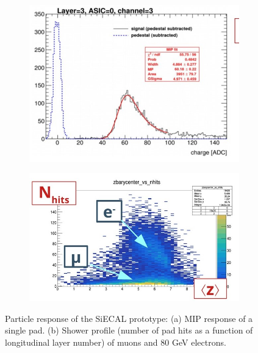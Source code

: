 \begin{figure}[t!]
\centering
\begin{subfigure}{0.48\textwidth}
\includegraphics[width=1.0\hsize]{Detector/fig/SiWECAL_signals_layer.jpg}
\caption{}
\end{subfigure}
\begin{subfigure}{0.48\textwidth}
\includegraphics[width=1.0\hsize]{Detector/fig/SiWECAL_signals_energy.jpg}
\caption{}
\end{subfigure}
\caption{Particle response of the SiECAL prototype: (a) MIP response of a single pad. (b) Shower profile (number of pad hits as a function of longitudinal layer number) of muons and 80 GeV electrons.}
\label{fig:det:SiWECAL_signals}
\end{figure}



